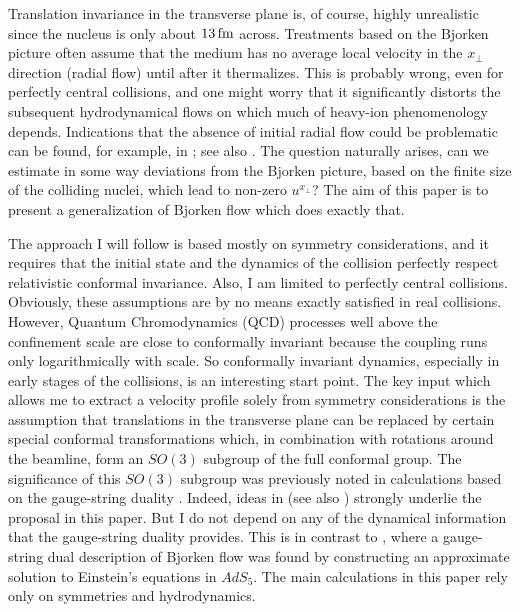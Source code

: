\documentclass[12pt]{article}
\begin{document}
Translation invariance in the transverse plane is, of course, highly unrealistic since the nucleus is only about $13\,{\rm fm}$ across.  Treatments based on the Bjorken picture often assume that the medium has no average local velocity in the $x_\perp$ direction (radial flow) until after it thermalizes.  This is probably wrong, even for perfectly central collisions, and one might worry that it significantly distorts the subsequent hydrodynamical flows on which much of heavy-ion phenomenology depends.  Indications that the absence of initial radial flow could be problematic can be found, for example, in \cite{Kolb:2002ve,Heinz:2004qz}; see also \cite{Lisa:2008gf,Broniowski:2008ee,Pratt:2008qv}.  The question naturally arises, can we estimate in some way deviations from the Bjorken picture, based on the finite size of the colliding nuclei, which lead to non-zero $u^{x_\perp}$?  The aim of this paper is to present a generalization of Bjorken flow which does exactly that.

The approach I will follow is based mostly on symmetry considerations, and it requires that the initial state and the dynamics of the collision perfectly respect relativistic conformal invariance.  Also, I am limited to perfectly central collisions.  Obviously, these assumptions are by no means exactly satisfied in real collisions.  However, Quantum Chromodynamics (QCD) processes well above the confinement scale are close to conformally invariant because the coupling runs only logarithmically with scale.  So conformally invariant dynamics, especially in early stages of the collisions, is an interesting start point.  The key input which allows me to extract a velocity profile solely from symmetry considerations is the assumption that translations in the transverse plane can be replaced by certain special conformal transformations which, in combination with rotations around the beamline, form an $SO(3)$ subgroup of the full conformal group.  The significance of this $SO(3)$ subgroup was previously noted in calculations \cite{Gubser:2008pc} based on the gauge-string duality \cite{Maldacena:1997re,Gubser:1998bc,Witten:1998qj}.  Indeed, ideas in \cite{Gubser:2008pc,Gubser:2009sx} (see also \cite{Kovchegov:2007pq,Grumiller:2008va}) strongly underlie the proposal in this paper.  But I do not depend on any of the dynamical information that the gauge-string duality provides.  This is in contrast to \cite{Janik:2005zt}, where a gauge-string dual description of Bjorken flow was found by constructing an approximate solution to Einstein's equations in $AdS_5$.  The main calculations in this paper rely only on symmetries and hydrodynamics. 
\end{document}
